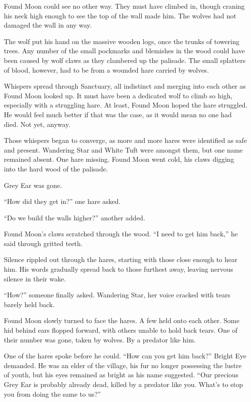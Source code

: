 Found Moon could see no other way. They must have climbed in, though craning his neck high enough to see the top of the wall made him. The wolves had not damaged the wall in any way.

The wolf put his hand on the massive wooden logs, once the trunks of towering trees. Any number of the small pockmarks and blemishes in the wood could have been caused by wolf claws as they clambered up the palisade. The small splatters of blood, however, had to be from a wounded hare carried by wolves.

Whispers spread through Sanctuary, all indistinct and merging into each other as Found Moon looked up. It must have been a dedicated wolf to climb so high, especially with a struggling hare. At least, Found Moon hoped the hare struggled. He would feel much better if that was the case, as it would mean no one had died. Not yet, anyway.

Those whispers began to converge, as more and more hares were identified as safe and present. Wandering Star and White Tuft were amongst them, but one name remained absent. One hare missing. Found Moon went cold, his claws digging into the hard wood of the palisade.

Grey Ear was gone.

``How did they get in?'' one hare asked.

``Do we build the walls higher?'' another added.

Found Moon's claws scratched through the wood. ``I need to get him back,'' he said through gritted teeth.

Silence rippled out through the hares, starting with those close enough to hear him. His words gradually spread back to those furthest away, leaving nervous silence in their wake.

``How?'' someone finally asked. Wandering Star, her voice cracked with tears barely held back.

Found Moon slowly turned to face the hares. A few held onto each other. Some hid behind ears flopped forward, with others unable to hold back tears. One of their number was gone, taken by wolves. By a predator like him.

One of the hares spoke before he could. ``How can you get him back?'' Bright Eye demanded. He was an elder of the village, his fur no longer possessing the lustre of youth, but his eyes remained as bright as his name suggested. ``Our precious Grey Ear is probably already dead, killed by a predator like you. What's to stop you from doing the same to us?''


